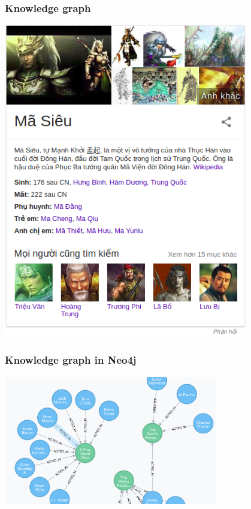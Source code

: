\documentclass{beamer}
\begin{document}
\begin{frame}
	\frametitle{Knowledge graph}		
			
	\begin{center} 
		\centering 
			\includegraphics[width=0.8\textwidth,height=0.8\textheight,keepaspectratio]{ggexample} 			
			\vspace{0.5cm}
	\end{center}		
		
			
\end{frame}


\begin{frame}
	\frametitle{Knowledge graph in Neo4j}		
			
	\begin{center} 
		\centering 
			\includegraphics[width=0.7\textwidth,height=0.7\textheight,keepaspectratio]{neo4j} 			
			\vspace{0.5cm}
	\end{center}		
		
			
\end{frame}
\end{document}
